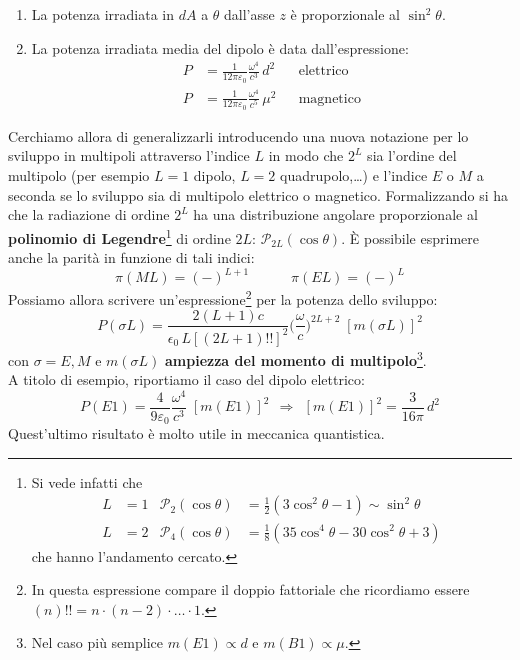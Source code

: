 \begin{enumerate}
    \item La potenza irradiata in $dA$ a $\theta$ dall'asse $z$ è proporzionale al $\sin^2{\theta}$.
    \item La potenza irradiata media del dipolo è data dall'espressione:
    \begin{displaymath}
    \begin{aligned}
    P&= \frac{1}{12\pi\varepsilon_0} \frac{\omega^4}{c^3} \, d^2 & &\text{elettrico} \\
    P&= \frac{1}{12\pi\varepsilon_0} \frac{\omega^4}{c^5} \, \mu^2 & &\text{magnetico} 
    \end{aligned}
    \end{displaymath}
\end{enumerate}
\noindent Cerchiamo allora di generalizzarli introducendo una nuova notazione per lo sviluppo in multipoli attraverso l'indice $L$ in modo che $2^L$ sia l'ordine del multipolo (per esempio $L=1$ dipolo, $L=2$ quadrupolo,\dots) e l'indice $E$ o $M$ a seconda se lo sviluppo sia di multipolo elettrico o magnetico. Formalizzando si ha che la radiazione di ordine $2^L$ ha una distribuzione angolare proporzionale al \textbf{polinomio di Legendre}\footnote{Si vede infatti che 
\begin{displaymath}
\begin{aligned}
L&=1 & \mathcal{P}_2(\cos{\theta})&= \frac{1}{2} (3\cos^2{\theta}-1)\sim\sin^2{\theta} \\
L&=2 & \mathcal{P}_4(\cos{\theta})&= \frac{1}{8} (35\cos^4{\theta}-30\cos^2{\theta}+3)
\end{aligned}
\end{displaymath}
che hanno l'andamento cercato.} di ordine $2L$: $\mathcal{P}_{2L}(\cos{\theta})$. È possibile esprimere anche la parità in funzione di tali indici:
$$\pi(ML)= (-)^{L+1} \qquad\quad \pi(EL)=(-)^L$$
Possiamo allora scrivere un'espressione\footnote{In questa espressione compare il doppio fattoriale che ricordiamo essere $(n)!! = n\cdot(n-2)\cdot\dots\cdot 1.$} per la potenza dello sviluppo:
$$P(\sigma L) = \frac{2(L+1)c}{\epsilon_0\,L[(2L+1)!!]^2} \bigl ( \frac{\omega}{c}\bigr)^{2L+2} \; [m(\sigma L)]^2 $$
con $\sigma = E,M$ e $m(\sigma L)$ \textbf{ampiezza del momento di multipolo}\footnote{Nel caso più semplice $m(E1) \propto d$ e $m(B1)\propto \mu$.}.\\
A titolo di esempio, riportiamo il caso del dipolo elettrico:
$$P(E1) = \frac{4}{9\varepsilon_0}\frac{\omega^4}{c^3}\;[m(E1)]^2 \;\,\Rightarrow\;\, [m(E1)]^2 = \frac{3}{16\pi}\,d^2$$
Quest'ultimo risultato è molto utile in meccanica quantistica.

